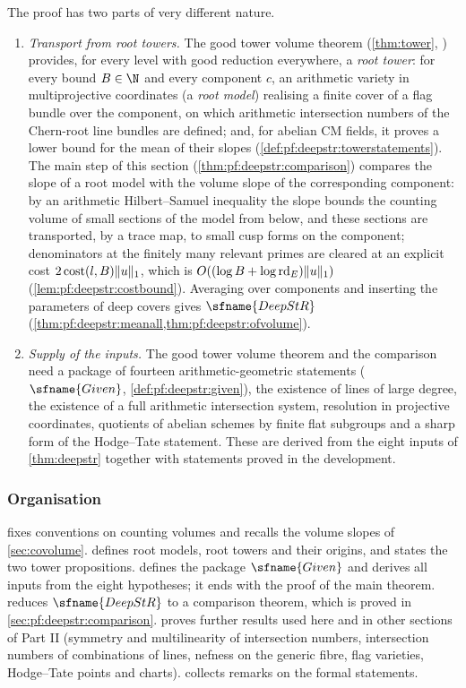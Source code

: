 The proof has two parts of very different nature.
\begin{enumerate}[label=(\Alph*)]
\item\emph{Transport from root towers.} The good tower volume theorem (\cref{thm:tower},
) provides, for every level
with good reduction everywhere, a \emph{root tower}: for every bound $B\in\N$ and every component $c$, an
arithmetic variety in multiprojective coordinates (a \emph{root model}) realising a finite cover of a flag
bundle over the component, on which arithmetic intersection numbers of the Chern-root line bundles are
defined; and, for abelian CM fields, it proves a lower bound for the mean of their slopes
(\cref{def:pf:deepstr:towerstatements}). The main step of this section
(\cref{thm:pf:deepstr:comparison}) compares the slope of a root model with the volume slope of the
corresponding component: by an arithmetic Hilbert--Samuel inequality the slope bounds the counting volume
of small sections of the model from below, and these sections are transported, by a trace map, to small
cusp forms on the component; denominators at the finitely many relevant primes are cleared at an explicit
cost $2\operatorname{cost}(l,B)\|u\|_1$, which is $O((\log B+\log\operatorname{rd}_E)\|u\|_1)$
(\cref{lem:pf:deepstr:costbound}). Averaging over components and inserting the parameters of deep covers
gives $\sfname{DeepStR}$ (\cref{thm:pf:deepstr:meanall,thm:pf:deepstr:ofvolume}).
\item\emph{Supply of the inputs.} The good tower volume theorem and the comparison need a package of
fourteen arithmetic-geometric statements ($\sfname{Given}$, \cref{def:pf:deepstr:given}), the existence of
lines of large degree, the existence of a full arithmetic intersection system, resolution in projective
coordinates, quotients of abelian schemes by finite flat subgroups and a sharp form of the Hodge--Tate
statement. These are derived from the eight inputs of \cref{thm:deepstr} together with statements proved
in the development.
\end{enumerate}

\subsubsection*{Organisation}
 fixes conventions on counting volumes and recalls the volume slopes of
\cref{sec:covolume}.  defines root models, root towers and their origins, and
states the two tower propositions.  defines the package $\sfname{Given}$ and
derives all inputs from the eight hypotheses; it ends with the proof of the main theorem.
 reduces $\sfname{DeepStR}$ to a comparison theorem, which is proved in
\cref{sec:pf:deepstr:comparison}.  proves further results used here and in other
sections of Part II (symmetry and multilinearity of intersection numbers, intersection numbers of
combinations of lines, nefness on the generic fibre, flag varieties, Hodge--Tate points and charts).
 collects remarks on the formal statements.

